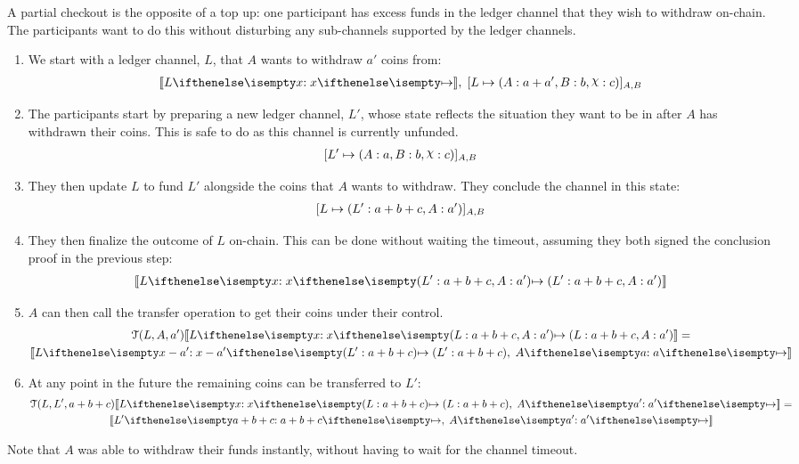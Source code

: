 \documentclass{article}
\begin{document}
A partial checkout is the opposite of a top up: 
one participant has excess funds in the ledger channel that they wish to withdraw on-chain.
The participants want to do this without disturbing any sub-channels supported by the ledger channels.
\begin{enumerate}
  \item We start with a ledger channel, $L$, that $A$ wants to withdraw $a'$ coins from:
  \begin{align}
    \adj{\holds{L}{x}{}}, \; \finalizable{L}{\alloc{A: a + a', B: b, \rchi: c}}{A, B}
  \end{align}
  \item The participants start by preparing a new ledger channel, $L'$, whose state reflects the situation they want to be in after $A$ has withdrawn their coins. This is safe to do as this channel is currently unfunded.
  \begin{align}
    \finalizable{L'}{\alloc{A: a, B:b, \rchi: c}}{A,B}
  \end{align}
  \item They then update $L$ to fund $L'$ alongside the coins that $A$ wants to withdraw. They conclude the channel in this state:
  \begin{align}
    [L \mapsto ( L': a + b + c, A: a' )]_{A,B}
  \end{align}
  \item They then finalize the outcome of $L$ on-chain. This can be done without waiting the timeout, assuming they both signed the conclusion proof in the previous step:
  \begin{align}
    \adj{\holds{L}{x}{\alloc{L': a + b + c, A: a'}}}
  \end{align}
  \item $A$ can then call the transfer operation to get their coins under their control. 
  \begin{multline}
    \transfer{L}{A}{a'}\adj{\holds{L}{x}{\alloc{L: a + b + c, A: a'}}} = \\ \adj{\holds{L}{x - a'}{\alloc{L': a + b + c}}, \; \holds{A}{a}{}}
  \end{multline}
  \item At any point in the future the remaining coins can be transferred to $L'$:
  \begin{multline}
    \transfer{L}{L'}{a + b + c}\adj{\holds{L}{x}{\alloc{L: a + b + c}}, \; \holds{A}{a'}{}} =  \\ \adj{\holds{L'}{a + b + c}{}, \; \holds{A}{a'}{}}
  \end{multline}
\end{enumerate}
Note that $A$ was able to withdraw their funds instantly, without having to wait for the channel timeout.
\end{document}
